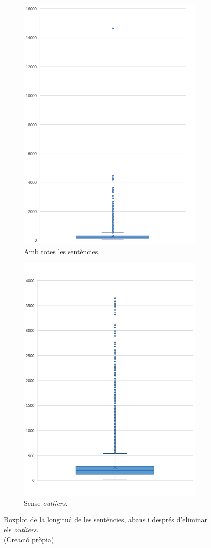 \begin{figure}[H]
  \centering
  \begin{subfigure}{.5\textwidth}
    \centering
    \includegraphics[width=.7\linewidth]{box_sent.png}
    \caption{Amb totes les sentències.}
    \label{fig:box_longitud_sentencies_tot}
  \end{subfigure}%
  \begin{subfigure}{.5\textwidth}
    \centering
    \includegraphics[width=.7\linewidth]{box_sent_out.png}
    \caption{Sense \textit{outliers}.}
    \label{fig:box_longitud_sentencies_out}
  \end{subfigure}
  \caption[Boxplot de la longitud de les sentències]{Boxplot de la longitud de les sentències, abans i després d'eliminar els \textit{outliers}. \\ (Creació pròpia)}
  \label{fig:box_longitud_sentencies}
\end{figure}

